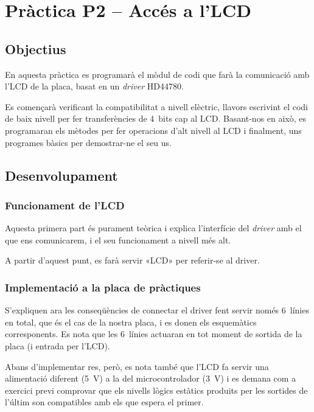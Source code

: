\chapter{\label{ch:p2} Pràctica P2 -- Accés a l'LCD}

\section{Objectius}

En aquesta pràctica es programarà el mòdul de codi que farà la comunicació
amb l'LCD de la placa, basat en un \emph{driver} HD44780.

Es començarà verificant la compatibilitat a nivell elèctric, llavors
escrivint el codi de baix nivell per fer transferències de 4~bits cap
al LCD. Basant-nos en això, es programaran els mètodes per fer operacions
d'alt nivell al LCD i finalment, uns programes bàsics per demostrar-ne el
seu us.

\section{Desenvolupament}


\subsection{Funcionament de l'LCD}

Aquesta primera part és purament teòrica i explica l'interfície del \emph{driver}
amb el que ens comunicarem, i el seu funcionament a nivell més alt.

A partir d'aquest punt, es farà servir «LCD» per referir-se al driver.


\subsection{Implementació a la placa de pràctiques}

S'expliquen ara les conseqüències de connectar el driver fent servir només 6~línies
en total, que és el cas de la nostra placa, i es donen els esquemàtics corresponents.
Es nota que les 6~línies actuaran en tot moment de sortida de la placa (i entrada
per l'LCD).

Abans d'implementar res, però, es nota també que l'LCD fa servir una alimentació
diferent (\SI{5}{\volt}) a la del microcontrolador (\SI{3}{\volt}) i es demana com
a exercici previ comprovar que els nivells lògics estàtics produits per les
sortides de l'últim son compatibles amb els que espera el primer.

